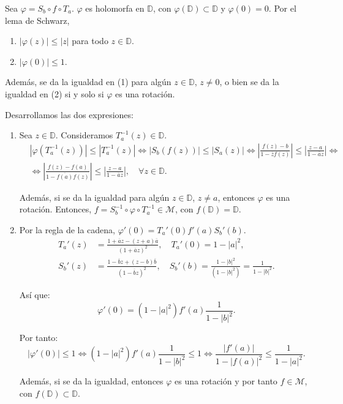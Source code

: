 Sea $\varphi = S_b \circ f \circ T_a$.
$\varphi$ es holomorfa en $\mathbb{D}$, con $\varphi(\mathbb{D}) \subset \mathbb{D}$ y $\varphi(0) = 0$.
Por el lema de Schwarz,
\begin{enumerate}
    \item $|\varphi(z)| \leq |z|$ para todo $z \in \mathbb{D}$.
    \item $|\varphi(0)| \leq 1$.
\end{enumerate}

Además, se da la igualdad en (1) para algún $z \in \mathbb{D}$, $z \neq 0$, o bien se da la igualdad en (2) si y solo si $\varphi$ es una rotación.

Desarrollamos las dos expresiones:
\begin{enumerate}
    \item Sea $z \in \mathbb{D}$.
          Consideramos $T_a^{-1}(z) \in \mathbb{D}$.
          \begin{align*}
               & |\varphi(T_a^{-1}(z))| \leq |T_a^{-1}(z)| \Leftrightarrow |S_b(f(z))| \leq |S_a(z)| \Leftrightarrow \left|\frac{f(z)-b}{1-\overline{z}f(z)}\right| \leq \left|\frac{z-a}{1-\overline{a}z}\right| \Leftrightarrow \\
               & \Leftrightarrow \left|\frac{f(z)-f(a)}{1-\overline{f(a)}f(z)}\right| \leq \left|\frac{z-a}{1-\overline{a}z}\right|, \quad \forall z \in \mathbb{D}.
          \end{align*}

          Además, si se da la igualdad para algún $z \in \mathbb{D}$, $z \neq a$, entonces $\varphi$ es una rotación.
          Entonces, $f = S_b^{-1} \circ \varphi \circ T_a^{-1} \in \mathcal{M}$, con $f(\mathbb{D}) = \mathbb{D}$.

    \item Por la regla de la cadena, $\varphi'(0) = T_a'(0) f'(a) S_b'(b)$.
          \begin{align*}
              T_a'(z) & = \frac{1 + \overline{a}z - (z+a)\overline{a}}{(1 + \overline{a}z)^2}, \quad T_a'(0) = 1 - |a|^2,                                     \\
              S_b'(z) & = \frac{1 - \overline{b}z + (z-b)\overline{b}}{(1 - \overline{b}z)^2}, \quad S_b'(b) = \frac{1-|b|^2}{(1-|b|^2)} = \frac{1}{1-|b|^2}.
          \end{align*}

          Así que:
          $$\varphi'(0) = (1-|a|^2)f'(a)\frac{1}{1-|b|^2}.$$

          Por tanto:
          $$|\varphi'(0)| \leq 1 \Leftrightarrow (1-|a|^2)f'(a)\frac{1}{1-|b|^2} \leq 1 \Leftrightarrow \frac{|f'(a)|}{1-|f(a)|^2} \leq \frac{1}{1-|a|^2}.$$

          Además, si se da la igualdad, entonces $\varphi$ es una rotación y por tanto $f \in \mathcal{M}$, con $f(\mathbb{D}) \subset \mathbb{D}$.
\end{enumerate}

